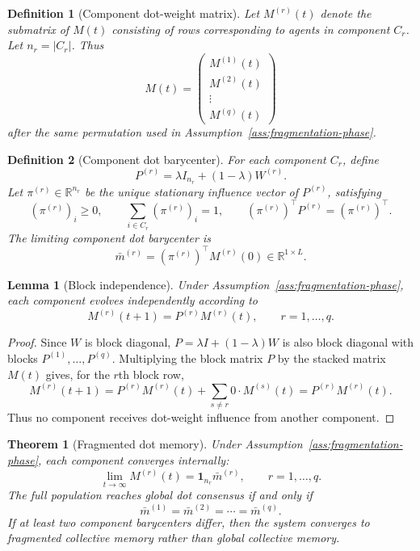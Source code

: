 \documentclass[11pt]{article}
\newtheorem{definition}{Definition}
\newtheorem{theorem}{Theorem}
\newtheorem{lemma}{Lemma}
\theoremstyle{remark}
\begin{document}
\begin{definition}[Component dot-weight matrix]
Let $M^{(r)}(t)$ denote the submatrix of $M(t)$ consisting of rows
corresponding to agents in component $C_r$. Let $n_r=|C_r|$. Thus
$$
M(t)=
\begin{pmatrix}
M^{(1)}(t)\\
M^{(2)}(t)\\
\vdots\\
M^{(q)}(t)
\end{pmatrix}
$$
after the same permutation used in Assumption~\ref{ass:fragmentation-phase}.
\end{definition}

\begin{definition}[Component dot barycenter]
For each component $C_r$, define
$$
P^{(r)}=\lambda I_{n_r}+(1-\lambda)W^{(r)}.
$$
Let $\pi^{(r)}\in\mathbb{R}^{n_r}$ be the unique stationary influence
vector of $P^{(r)}$, satisfying
$$
(\pi^{(r)})_i\geq0,\qquad \sum_{i\in C_r}(\pi^{(r)})_i=1,
\qquad (\pi^{(r)})^\top P^{(r)}=(\pi^{(r)})^\top.
$$
The limiting component dot barycenter is
$$
\bar m^{(r)}=(\pi^{(r)})^\top M^{(r)}(0)\in\mathbb{R}^{1\times L}.
$$
\end{definition}

\begin{lemma}[Block independence]\label{lem:block-independence}
Under Assumption~\ref{ass:fragmentation-phase}, each component evolves
independently according to
$$
M^{(r)}(t+1)=P^{(r)}M^{(r)}(t), \qquad r=1,\ldots,q.
$$
\end{lemma}

\begin{proof}
Since $W$ is block diagonal, $P=\lambda I+(1-\lambda)W$ is also block
diagonal with blocks $P^{(1)},\ldots,P^{(q)}$. Multiplying the block
matrix $P$ by the stacked matrix $M(t)$ gives, for the $r$th block row,
$$
M^{(r)}(t+1)=P^{(r)}M^{(r)}(t)+\sum_{s\neq r}0\cdot M^{(s)}(t)
=P^{(r)}M^{(r)}(t).
$$
Thus no component receives dot-weight influence from another component.
\end{proof}

\begin{theorem}[Fragmented dot memory]\label{thm:fragmented-dot-memory}
Under Assumption~\ref{ass:fragmentation-phase}, each component converges
internally:
$$
\lim_{t\to\infty}M^{(r)}(t)=\mathbf{1}_{n_r}\bar m^{(r)},
\qquad r=1,\ldots,q.
$$
The full population reaches global dot consensus if and only if
$$
\bar m^{(1)}=\bar m^{(2)}=\cdots=\bar m^{(q)}.
$$
If at least two component barycenters differ, then the system converges
to fragmented collective memory rather than global collective memory.
\end{theorem}
\end{document}
